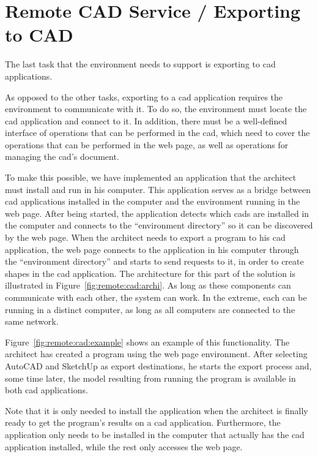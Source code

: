 

\section{Remote CAD Service / Exporting to CAD}
The last task that the environment needs to support is exporting to \gls{cad} applications.

As opposed to the other tasks, exporting to a \gls{cad} application requires the environment to communicate with it.
To do so, the environment must locate the \gls{cad} application and connect to it.
In addition, there must be a well-defined interface of operations that can be performed in the \gls{cad}, which need to cover the operations that can be performed in the web page, as well as operations for managing the \gls{cad}'s document.

To make this possible, we have implemented an application that the architect must install and run in his computer.
This application serves as a bridge between \gls{cad} applications installed in the computer and the environment running in the web page.
After being started, the application detects which \glspl{cad} are installed in the computer and connects to the ``environment directory'' so it can be discovered by the web page.
When the architect needs to export a program to his \gls{cad} application, the web page connects to the application in his computer through the ``environment directory'' and starts to send requests to it, in order to create shapes in the \gls{cad} application.
The architecture for this part of the solution is illustrated in Figure~\ref{fig:remote:cad:archi}.
As long as these components can communicate with each other, the system can work.
In the extreme, each can be running in a distinct computer, as long as all computers are connected to the same network.

Figure~\ref{fig:remote:cad:example} shows an example of this functionality.
The architect has created a program using the web page environment.
After selecting AutoCAD and SketchUp as export destinations, he starts the export process and, some time later, the model resulting from running the program is available in both \gls{cad} applications.

Note that it is only needed to install the application when the architect is finally ready to get the program's results on a \gls{cad} application.
Furthermore, the application only needs to be installed in the computer that actually has the \gls{cad} application installed, while the rest only accesses the web page.


